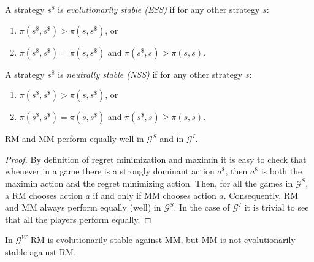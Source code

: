 \documentclass[fleqn,reqno,11pt]{article}
\begin{document}
\medskip{}

\begin{definition}
A strategy $s^{\$}$ is \emph{evolutionarily stable
(ESS)} if for any other strategy $s$:
\begin{enumerate}
\item $\pi(s^{\$},s^{\$})>\pi(s,s^{\$})$, or
\item $\pi(s^{\$},s^{\$})=\pi(s,s^{\$})$ and $\pi(s^{\$},s)>\pi(s,s)$.
\end{enumerate}
\noindent A strategy $s^{\$}$ is \emph{neutrally stable (NSS)} if
for any other strategy $s$:
\begin{enumerate}
\item $\pi(s^{\$},s^{\$})>\pi(s,s^{\$})$, or
\item $\pi(s^{\$},s^{\$})=\pi(s,s^{\$})$ and $\pi(s^{\$},s)\geq\pi(s,s)$.
\end{enumerate}
\end{definition}

\medskip{}

\begin{lemma}
RM and MM perform equally well in $\mathcal{G}^{S}$
and in $\mathcal{G}^{I}$. 
\end{lemma}

\begin{proof}
By definition of regret minimization and maximin it
is easy to check that whenever in a game there is a strongly dominant
action $a^{\$}$, then $a^{\$}$ is both the maximin action and the
regret minimizing action. Then, for all the games in $\mathcal{G}^{S}$,
a RM chooses action $a$ if and only if MM chooses action $a$. Consequently,
RM and MM always perform equally (well) in $\mathcal{G}^{S}$. In
the case of $\mathcal{G}^{I}$ it is trivial to see that all the players
perform equally.
\end{proof}

\medskip{}

\begin{lemma}
In $\mathcal{G}^{W}$ RM is evolutionarily stable
against MM, but MM is not evolutionarily stable against RM.
\end{lemma}
\end{document}
